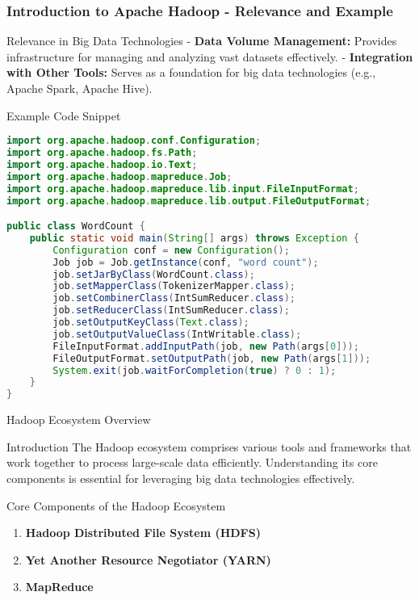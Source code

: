 \documentclass[aspectratio=169]{beamer}
\begin{document}
\begin{frame}[fragile]
    \frametitle{Introduction to Apache Hadoop - Relevance and Example}
    \begin{block}{Relevance in Big Data Technologies}
        - \textbf{Data Volume Management:} Provides infrastructure for managing and analyzing vast datasets effectively.
        - \textbf{Integration with Other Tools:} Serves as a foundation for big data technologies (e.g., Apache Spark, Apache Hive).
    \end{block}

    \begin{block}{Example Code Snippet}
        \begin{lstlisting}[language=Java]
import org.apache.hadoop.conf.Configuration;
import org.apache.hadoop.fs.Path;
import org.apache.hadoop.io.Text;
import org.apache.hadoop.mapreduce.Job;
import org.apache.hadoop.mapreduce.lib.input.FileInputFormat;
import org.apache.hadoop.mapreduce.lib.output.FileOutputFormat;

public class WordCount {
    public static void main(String[] args) throws Exception {
        Configuration conf = new Configuration();
        Job job = Job.getInstance(conf, "word count");
        job.setJarByClass(WordCount.class);
        job.setMapperClass(TokenizerMapper.class);
        job.setCombinerClass(IntSumReducer.class);
        job.setReducerClass(IntSumReducer.class);
        job.setOutputKeyClass(Text.class);
        job.setOutputValueClass(IntWritable.class);
        FileInputFormat.addInputPath(job, new Path(args[0]));
        FileOutputFormat.setOutputPath(job, new Path(args[1]));
        System.exit(job.waitForCompletion(true) ? 0 : 1);
    }
}
        \end{lstlisting}
    \end{block}
\end{frame}

\begin{frame}{Hadoop Ecosystem Overview}
    \begin{block}{Introduction}
        The Hadoop ecosystem comprises various tools and frameworks that work together to process large-scale data efficiently. Understanding its core components is essential for leveraging big data technologies effectively.
    \end{block}
\end{frame}

\begin{frame}{Core Components of the Hadoop Ecosystem}
    \begin{enumerate}
        \item \textbf{Hadoop Distributed File System (HDFS)}
        \item \textbf{Yet Another Resource Negotiator (YARN)}
        \item \textbf{MapReduce}
    \end{enumerate}
\end{frame}
\end{document}
